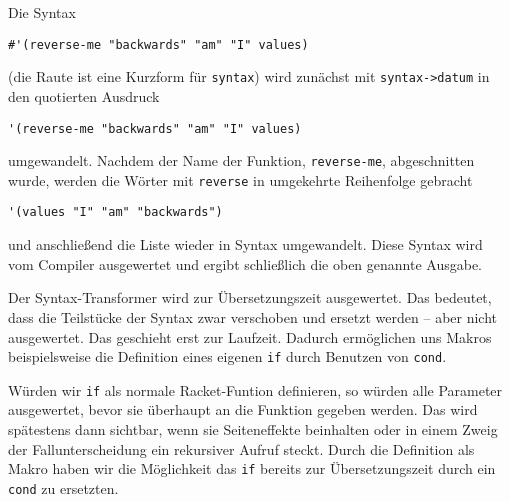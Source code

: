 Die Syntax

\begin{lstlisting}
#'(reverse-me "backwards" "am" "I" values)
\end{lstlisting}

(die Raute ist eine Kurzform für \texttt{syntax}) wird zunächst mit \texttt{syntax->datum} in den quotierten Ausdruck 

\begin{lstlisting}
'(reverse-me "backwards" "am" "I" values)
\end{lstlisting}


umgewandelt. Nachdem der Name der Funktion, \texttt{reverse-me}, abgeschnitten wurde, werden die Wörter mit \texttt{reverse} in umgekehrte Reihenfolge gebracht

\begin{lstlisting}
'(values "I" "am" "backwards")
\end{lstlisting}

und anschließend die Liste wieder in Syntax umgewandelt. Diese Syntax wird vom Compiler ausgewertet und ergibt schließlich die oben genannte Ausgabe.


Der Syntax-Transformer wird zur Übersetzungszeit ausgewertet. Das bedeutet, dass die Teilstücke der Syntax zwar verschoben und ersetzt werden -- aber nicht ausgewertet. Das geschieht erst zur Laufzeit. Dadurch ermöglichen uns Makros beispielsweise die Definition eines eigenen \texttt{if} durch Benutzen von \texttt{cond}.

Würden wir \texttt{if} als normale Racket-Funtion definieren, so würden alle Parameter ausgewertet, bevor sie überhaupt an die Funktion gegeben werden. Das wird spätestens dann sichtbar, wenn sie Seiteneffekte beinhalten oder in einem Zweig der Fallunterscheidung ein rekursiver Aufruf steckt. Durch die Definition als Makro haben wir die Möglichkeit das \texttt{if} bereits zur Übersetzungszeit durch ein \texttt{cond} zu ersetzten.

